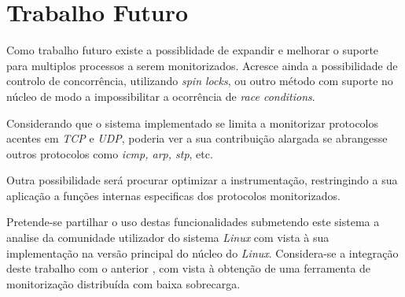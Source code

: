 \section{Trabalho Futuro}
\label{sec:future_work}
Como trabalho futuro existe a possiblidade de expandir e melhorar o suporte para multiplos processos a serem monitorizados.
Acresce ainda a possibilidade de controlo de concorrência, utilizando \textit{spin locks}, ou outro método com suporte no núcleo de modo a impossibilitar a ocorrência de \textit{race conditions}.

Considerando que o sistema implementado se limita a monitorizar protocolos acentes em \textit{TCP} e \textit{UDP}, poderia ver a sua contribuição alargada se abrangesse outros protocolos como \textit{icmp, arp, stp}, etc.

Outra possibilidade será procurar optimizar a instrumentação, restringindo a sua aplicação a funções internas especificas dos protocolos monitorizados.

Pretende-se partilhar o uso destas funcionalidades submetendo este sistema a analise da comunidade utilizador do sistema \textit{Linux} com vista à sua implementação na versão principal do núcleo do \textit{Linux}.
Considera-se a integração deste trabalho com o anterior \cite{duarte10,Farruca:2009}, com vista à obtenção de uma ferramenta de monitorização distribuída com baixa sobrecarga.
